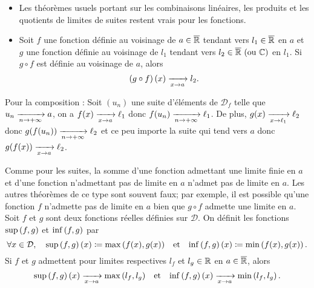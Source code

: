 \documentclass{magnolia}
\begin{document}
\begin{proposition}[utile=-3]
\begin{itemize}
\item Les théorèmes usuels portant sur les combinaisons linéaires, les produits
  et les quotients de limites de suites restent vrais pour les fonctions.
\item Soit $f$ une fonction définie au voisinage de $a\in\overline{\mathbb{R}}$ tendant vers $l_1\in\overline{\mathbb{R}}$
  en $a$ et $g$ une fonction définie au voisinage de $l_1$ tendant vers
  $l_2\in\text{$\overline{\mathbb{R}}$ (ou $\mathbb{C}$)}$ en $l_1$. Si $g\circ f$ est définie au voisinage de $a$, alors
  \[\left(g\circ f\right)(x) \xrightarrow[x\rightarrow a]{} l_2.\]
\end{itemize}
\end{proposition}

\begin{preuve}
Pour la composition  :
Soit $(u_n)$ une suite d'éléments de $\mathcal{D}_f$ telle que $u_n\xrightarrow[n\rightarrow +\infty]{}a$, on a $f(x)\xrightarrow[x\rightarrow a]{}\ell_1$ donc $f(u_n)\xrightarrow[n\rightarrow +\infty]{}\ell_1$. De plus, $g(x)\xrightarrow[x\rightarrow \ell_1]{}\ell_2$ donc $g(f(u_n))\xrightarrow[n\rightarrow +\infty]{}\ell_2$ et ce peu importe la suite qui tend vers $a$ donc $g(f(x))\xrightarrow[x\rightarrow a]{} \ell_2$.
\end{preuve}

\begin{remarques}
\remarque Comme pour les suites, la somme d'une fonction admettant une limite
  finie en $a$ et d'une fonction n'admettant pas de limite en $a$ n'admet pas de
  limite en $a$.
  Les autres théorèmes de ce type sont souvent faux;
  par exemple, il est possible qu'une fonction $f$ n'admette pas de limite en
  $a$ bien que $g\circ f$ admette une limite en $a$.
\remarque Soit $f$ et $g$ sont deux fonctions réelles définies sur
  $\mathcal{D}$. On définit les fonctions $\sup\left(f,g\right)$ et $\inf\left(f,g\right)$ par
  \[\forall x\in\mathcal{D} ,\quad \sup\left(f,g\right)(x)\coloneqq\max\left(f(x),g(x)\right) \quad\!\text{et}\quad\!
    \inf\left(f,g\right)(x)\coloneqq\min\left(f(x),g(x)\right).\]
  Si $f$ et $g$ admettent pour limites respectives $l_f$ et $l_g\in\mathbb{R}$ en
  $a\in\overline{\mathbb{R}}$, alors
  \[\sup\left(f,g\right)(x)\xrightarrow[x\rightarrow a]{}\max\left(l_f,l_g\right) \quad\!\text{et}\quad\! 
    \inf\left(f,g\right)(x)\xrightarrow[x\rightarrow a]{}\min\left(l_f,l_g\right).\]
\end{remarques}

\end{document}
